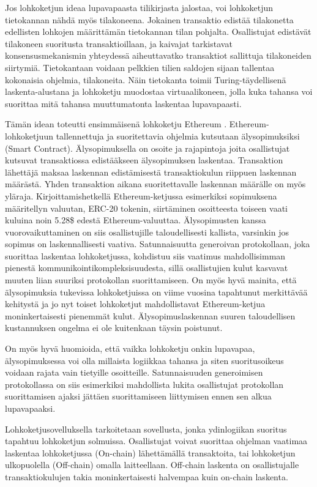 Jos lohkoketjun ideaa lupavapaasta tilikirjasta jalostaa, voi lohkoketjun tietokannan nähdä myös tilakoneena. Jokainen transaktio edistää tilakonetta edellisten lohkojen määrittämän tietokannan tilan pohjalta. Osallistujat edistävät tilakoneen suoritusta transaktioillaan, ja kaivajat tarkistavat konsensusmekanismin yhteydessä aiheuttavatko transaktiot sallittuja tilakoneiden siirtymiä. Tietokantaan voidaan pelkkien tilien saldojen sijaan tallentaa kokonaisia ohjelmia, tilakoneita. Näin tietokanta toimii Turing-täydellisenä laskenta-alustana ja lohkoketju muodostaa virtuaalikoneen, jolla kuka tahansa voi suorittaa mitä tahansa muuttumatonta laskentaa lupavapaasti.

Tämän idean toteutti ensimmäisenä lohkoketju Ethereum \cite{buterin_ethereum_2014}. Ethereum-lohkoketjuun tallennettuja ja suoritettavia ohjelmia kutsutaan älysopimuksiksi (Smart Contract). Älysopimuksella on osoite ja rajapintoja joita osallistujat kutsuvat transaktiossa edistääkseen älysopimuksen laskentaa. Transaktion lähettäjä maksaa laskennan edistämisestä transaktiokulun riippuen laskennan määrästä. Yhden transaktion aikana suoritettavalle laskennan määrälle on myös yläraja. Kirjoittamishetkellä Ethereum-ketjussa esimerkiksi sopimuksena määritellyn valuutan, ERC-20 tokenin, siirtäminen osoitteesta toiseen vaati kuluina noin 5.28\$ edestä Ethereum-valuuttaa. Älysopimusten kanssa vuorovaikuttaminen on siis osallistujille taloudellisesti kallista, varsinkin jos sopimus on laskennallisesti vaativa. Satunnaisuutta generoivan protokollaan, joka suorittaa laskentaa lohkoketjussa, kohdistuu siis vaatimus mahdollisimman pienestä kommunikointikompleksisuudesta, sillä osallistujien kulut kasvavat muuten liian suuriksi protokollan suorittamiseen. On myös hyvä mainita, että älysopimuksia tukevissa lohkoketjuissa on viime vuosina tapahtunut merkittävää kehitystä ja jo nyt toiset lohkoketjut mahdollistavat Ethereum-ketjua moninkertaisesti pienemmät kulut. Älysopimuslaskennan suuren taloudellisen kustannuksen ongelma ei ole kuitenkaan täysin poistunut. 

On myös hyvä huomioida, että vaikka lohkoketju onkin lupavapaa, älysopimuksessa voi olla millaista logiikkaa tahansa ja siten suoritusoikeus voidaan rajata vain tietyille osoitteille. Satunnaisuuden generoimisen protokollassa on siis esimerkiksi mahdollista lukita osallistujat protokollan suorittamisen ajaksi jättäen suorittamiseen liittymisen ennen sen alkua lupavapaaksi.

Lohkoketjusovelluksella tarkoitetaan sovellusta, jonka ydinlogiikan suoritus tapahtuu lohkoketjun solmuissa. Osallistujat voivat suorittaa ohjelman vaatimaa laskentaa lohkoketjussa (On-chain) lähettämällä transaktoita, tai lohkoketjun ulkopuolella (Off-chain) omalla laitteellaan. Off-chain laskenta on osallistujalle transaktiokulujen takia moninkertaisesti halvempaa kuin on-chain laskenta. 



